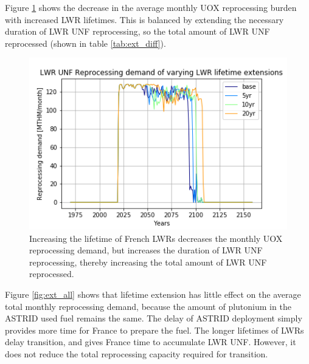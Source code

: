 Figure \ref{fig:ext_uox} shows the decrease in the average monthly
\gls{UOX} reprocessing burden with increased \gls{LWR} lifetimes.
This is balanced by extending the necessary duration of 
\gls{LWR} \gls{UNF} reprocessing,
so
the total amount of \gls{LWR} \gls{UNF} reprocessed (shown in table
\ref{tab:ext_diff}).


\begin{figure}[htbp!]
	\begin{center}
		\includegraphics[scale=0.7]{./images/sensitivity/ext_uox_rep.png}
	\end{center}
	\caption{Increasing the lifetime of French \glspl{LWR} decreases the monthly
		\gls{UOX} reprocessing demand, but increases the duration of \gls{LWR} \gls{UNF}
		reprocessing, thereby increasing the total amount of \gls{LWR} \gls{UNF} reprocessed.}
	\label{fig:ext_uox}
\end{figure}

Figure \ref{fig:ext_all} shows that lifetime extension has little
effect on the average total monthly reprocessing demand, because
the amount of plutonium in the \gls{ASTRID} used fuel remains the same.
The delay of \gls{ASTRID} deployment simply provides more time for
France to prepare the fuel. 
The longer lifetimes of \glspl{LWR} delay transition, and gives France
time to accumulate \gls{LWR} \gls{UNF}. However, it does not reduce
the total reprocessing capacity required for transition.



